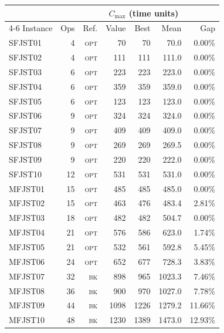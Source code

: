 \begin{tabular}{lrrrrrr}
\toprule
& & & \multicolumn{3}{c}{$C_{\max}$ (time units)} & \\
\cmidrule(lr){4-6}
Instance & Ops & Ref. & \multicolumn{1}{c}{Value} & Best & Mean & Gap \\
\midrule
SFJST01 & 4 & \textsc{opt} & 70 & 70\rlap{$^*$} & 70.0 & 0.00\% \\
SFJST02 & 4 & \textsc{opt} & 111 & 111\rlap{$^*$} & 111.0 & 0.00\% \\
SFJST03 & 6 & \textsc{opt} & 223 & 223\rlap{$^*$} & 223.0 & 0.00\% \\
SFJST04 & 6 & \textsc{opt} & 359 & 359\rlap{$^*$} & 359.0 & 0.00\% \\
SFJST05 & 6 & \textsc{opt} & 123 & 123\rlap{$^*$} & 123.0 & 0.00\% \\
SFJST06 & 9 & \textsc{opt} & 324 & 324\rlap{$^*$} & 324.0 & 0.00\% \\
SFJST07 & 9 & \textsc{opt} & 409 & 409\rlap{$^*$} & 409.0 & 0.00\% \\
SFJST08 & 9 & \textsc{opt} & 269 & 269\rlap{$^*$} & 269.5 & 0.00\% \\
SFJST09 & 9 & \textsc{opt} & 220 & 220\rlap{$^*$} & 222.0 & 0.00\% \\
SFJST10 & 12 & \textsc{opt} & 531 & 531\rlap{$^*$} & 531.0 & 0.00\% \\
MFJST01 & 15 & \textsc{opt} & 485 & 485\rlap{$^*$} & 485.0 & 0.00\% \\
MFJST02 & 15 & \textsc{opt} & 463 & 476 & 483.4 & 2.81\% \\
MFJST03 & 18 & \textsc{opt} & 482 & 482\rlap{$^*$} & 504.7 & 0.00\% \\
MFJST04 & 21 & \textsc{opt} & 576 & 586 & 623.0 & 1.74\% \\
MFJST05 & 21 & \textsc{opt} & 532 & 561 & 592.8 & 5.45\% \\
MFJST06 & 24 & \textsc{opt} & 652 & 677 & 728.3 & 3.83\% \\
MFJST07 & 32 & \textsc{bk} & 898 & 965 & 1023.3 & 7.46\% \\
MFJST08 & 36 & \textsc{bk} & 900 & 970 & 1027.0 & 7.78\% \\
MFJST09 & 44 & \textsc{bk} & 1098 & 1226 & 1279.2 & 11.66\% \\
MFJST10 & 48 & \textsc{bk} & 1230 & 1389 & 1473.0 & 12.93\% \\
\bottomrule
\end{tabular}
